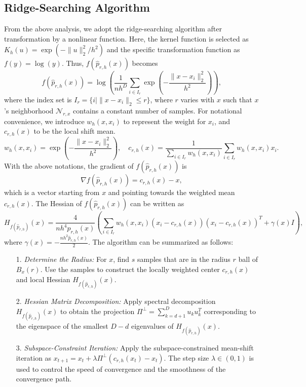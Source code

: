\documentclass[aos,preprint]{imsart}
\theoremstyle{remark}
\begin{document}
\begin{appendix}
\section{Ridge-Searching Algorithm}
From the above analysis, we adopt the ridge-searching algorithm after transformation by a nonlinear function. Here, the kernel function is selected as $K_h(u) = \exp(-\|u\|_2^2/h^2)$ and the specific transformation function as $f(y) = \log(y)$. Thus, $f(\hat{p}_{r,h}(x))$ becomes
\[
f(\hat{p}_{r,h}(x)) = \log(\frac{1}{n h^D}\sum_{i\in I_{r}} \exp(-\frac{\|x-x_i\|_2^2}{h^2}) ),
\]
where the index set is $I_{r} = \{ i | \|x-x_i\|_2\leq r \}$, where $r$ varies with $x$ such that $x$'s neighborhood ${\mathcal N}_{r,x}$ contains a constant number of samples. For notational convenience, we introduce $w_h(x, x_i)$ to represent the weight for $x_i$, and $c_{r,h}(x)$ to be the local shift mean.
\[
w_h(x, x_i) = \exp(-\frac{\|x-x_i\|_2^2}{h^2}), \quad c_{r,h}(x) = \frac{1}{\sum_{i\in I_r} w_h(x,x_i)}\sum_{i\in I_r} w_h(x, x_i)x_i.
\]
With the above notations, the gradient of $f(\hat{p}_{r,h}(x))$ is
\[
\nabla f(\hat{p}_{r,h}(x)) = c_{r,h}(x) - x,
\] 
which is a vector starting from $x$ and pointing towards the weighted mean $c_{r,h}(x)$.
The Hessian of $f(\hat{p}_{r,h}(x))$ can be written as
\[
H_{f(\hat{p}_{r,h})}(x) = \frac{4}{n h^{4} \hat{p}_{r,h}(x)}(\sum_{i\in I_r} w_h(x,x_i) (x_i - c_{r,h}(x))(x_i - c_{r,h}(x))^T+
\gamma(x)I),
\]
where $\gamma(x) = -\frac{n h^2 \hat{p}_{r,h}(x)}{2}$.
The algorithm can be summarized as follows:
\begin{itemize}
\item[1.] {\it Determine the Radius:} For $x$, find $s$ samples that are in the radius $r$ ball of $B_x(r)$. Use the samples to construct the locally weighted center $c_{r,h}(x)$ and local Hessian $H_{f(\hat{p}_{r,h})}(x)$.
\item[2.] {\it Hessian Matrix Decomposition:} Apply spectral decomposition $H_{f(\hat{p}_{r,h})}(x)$ to obtain the projection $\Pi^{\perp}=\sum_{k = d+1}^D u_k u_k^T $ corresponding to the eigenspace of  the smallest $D-d$  eigenvalues of $H_{f(\hat{p}_{r,h})}(x)$.
\item[3.] {\it Subspace-Constraint Iteration:} Apply the subspace-constrained mean-shift iteration as $x_{t+1} = x_t + \lambda \Pi^\perp (c_{r,h}(x_t) - x_t)$.
The step size $\lambda\in (0,1)$ is used to control the speed of convergence and the smoothness of the convergence path.
\end{itemize}


\end{appendix}
\end{document}
